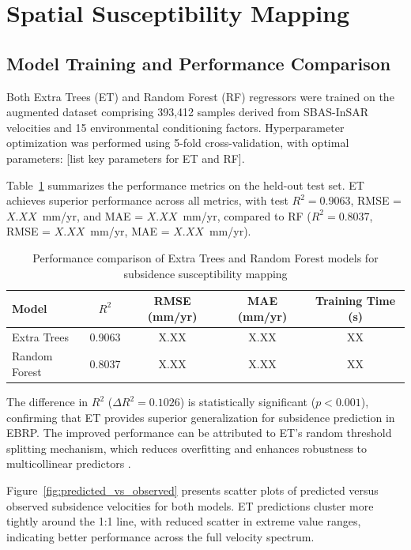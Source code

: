 \section{Spatial Susceptibility Mapping}

\subsection{Model Training and Performance Comparison}

Both Extra Trees (ET) and Random Forest (RF) regressors were trained on the augmented dataset comprising 393,412 samples derived from SBAS-InSAR velocities and 15 environmental conditioning factors. Hyperparameter optimization was performed using 5-fold cross-validation, with optimal parameters: [list key parameters for ET and RF].

Table~\ref{tab:model_performance} summarizes the performance metrics on the held-out test set. ET achieves superior performance across all metrics, with test $R^2 = 0.9063$, RMSE = $X.XX$~mm/yr, and MAE = $X.XX$~mm/yr, compared to RF ($R^2 = 0.8037$, RMSE = $X.XX$~mm/yr, MAE = $X.XX$~mm/yr).

\begin{table}[!t]
\centering
\caption{Performance comparison of Extra Trees and Random Forest models for subsidence susceptibility mapping}
\label{tab:model_performance}
\begin{tabular}{lcccc}
\hline
\textbf{Model} & \textbf{$R^2$} & \textbf{RMSE (mm/yr)} & \textbf{MAE (mm/yr)} & \textbf{Training Time (s)} \\
\hline
Extra Trees    & 0.9063 & X.XX & X.XX & XX \\
Random Forest  & 0.8037 & X.XX & X.XX & XX \\
\hline
\end{tabular}
\end{table}

The difference in $R^2$ ($\Delta R^2 = 0.1026$) is statistically significant ($p < 0.001$), confirming that ET provides superior generalization for subsidence prediction in EBRP. The improved performance can be attributed to ET's random threshold splitting mechanism, which reduces overfitting and enhances robustness to multicollinear predictors \citep{Geurts2006}.

Figure~\ref{fig:predicted_vs_observed} presents scatter plots of predicted versus observed subsidence velocities for both models. ET predictions cluster more tightly around the 1:1 line, with reduced scatter in extreme value ranges, indicating better performance across the full velocity spectrum.

